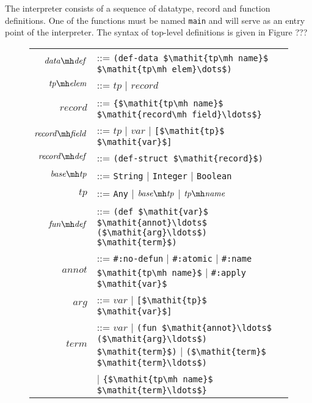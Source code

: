 The interpreter consists of a sequence of datatype, record and function definitions.
One of the functions must be named \lstinline!main! and will serve as an entry point of the interpreter.
The syntax of top-level definitions is given in Figure ???

\begin{figure}
\centering
\begin{tabular}{rl}
$\mathit{data\mh def}$
& ::= \lstinline!(def-data $\mathit{tp\mh name}$ $\mathit{tp\mh elem}\dots$)!\\

$\mathit{tp\mh elem}$
& ::= $\mathit{tp}$ | $\mathit{record}$\\

$\mathit{record}$
& ::= \lstinline!{$\mathit{tp\mh name}$ $\mathit{record\mh field}\ldots$}!\\

$\mathit{record\mh field}$
& ::= $\mathit{tp}$
  | $\mathit{var}$
  | \lstinline![$\mathit{tp}$ $\mathit{var}$]!\\

$\mathit{record\mh def}$
& ::= \lstinline!(def-struct $\mathit{record}$)!\\

$\mathit{base\mh tp}$
& ::= \lstinline!String! | \lstinline!Integer! | \lstinline!Boolean!\\

$\mathit{tp}$
& ::= \lstinline!Any! | $\mathit{base\mh tp}$ | $\mathit{tp\mh name}$\\

$\mathit{fun\mh def}$
& ::= \lstinline!(def $\mathit{var}$ $\mathit{annot}\ldots$ ($\mathit{arg}\ldots$) $\mathit{term}$)!\\

$\mathit{annot}$
& ::= \lstinline!#:no-defun!
    | \lstinline!#:atomic!
    | \lstinline!#:name $\mathit{tp\mh name}$!
    | \lstinline!#:apply $\mathit{var}$!\\

$\mathit{arg}$
& ::= $\mathit{var}$ | \lstinline![$\mathit{tp}$ $\mathit{var}$]!\\

$\mathit{term}$
& ::= $\mathit{var}$ 
    | \lstinline!(fun $\mathit{annot}\ldots$ ($\mathit{arg}\ldots$) $\mathit{term}$)!
    | \lstinline!($\mathit{term}$ $\mathit{term}\ldots$)!\\
&   | \lstinline!{$\mathit{tp\mh name}$ $\mathit{term}\ldots$}!
\end{tabular}
\end{figure}